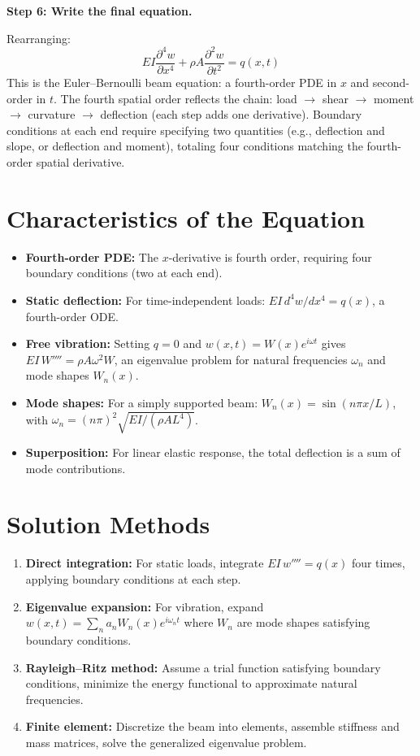 \documentclass[11pt,openright]{book}
\begin{document}
\textbf{Step 6: Write the final equation.}

Rearranging:
\begin{equation}
\boxed{EI\frac{\partial^4 w}{\partial x^4} + \rho A\frac{\partial^2 w}{\partial t^2} = q(x,t)}
\end{equation}
This is the Euler--Bernoulli beam equation: a fourth-order PDE in $x$ and second-order in $t$. The fourth spatial order reflects the chain: load $\to$ shear $\to$ moment $\to$ curvature $\to$ deflection (each step adds one derivative). Boundary conditions at each end require specifying two quantities (e.g., deflection and slope, or deflection and moment), totaling four conditions matching the fourth-order spatial derivative.

\section*{Characteristics of the Equation}

\begin{itemize}
\item \textbf{Fourth-order PDE:} The $x$-derivative is fourth order, requiring four boundary conditions (two at each end).
\item \textbf{Static deflection:} For time-independent loads: $EI \, d^4w/dx^4 = q(x)$, a fourth-order ODE.
\item \textbf{Free vibration:} Setting $q = 0$ and $w(x,t) = W(x)e^{i\omega t}$ gives $EI \, W'''' = \rho A \omega^2 W$, an eigenvalue problem for natural frequencies $\omega_n$ and mode shapes $W_n(x)$.
\item \textbf{Mode shapes:} For a simply supported beam: $W_n(x) = \sin(n\pi x/L)$, with $\omega_n = (n\pi)^2 \sqrt{EI/(\rho A L^4)}$.
\item \textbf{Superposition:} For linear elastic response, the total deflection is a sum of mode contributions.
\end{itemize}
\section*{Solution Methods}

\begin{enumerate}
\item \textbf{Direct integration:} For static loads, integrate $EI \, w'''' = q(x)$ four times, applying boundary conditions at each step.
\item \textbf{Eigenvalue expansion:} For vibration, expand $w(x,t) = \sum_n a_n W_n(x) e^{i\omega_n t}$ where $W_n$ are mode shapes satisfying boundary conditions.
\item \textbf{Rayleigh--Ritz method:} Assume a trial function satisfying boundary conditions, minimize the energy functional to approximate natural frequencies.
\item \textbf{Finite element:} Discretize the beam into elements, assemble stiffness and mass matrices, solve the generalized eigenvalue problem.
\end{enumerate}
\end{document}
